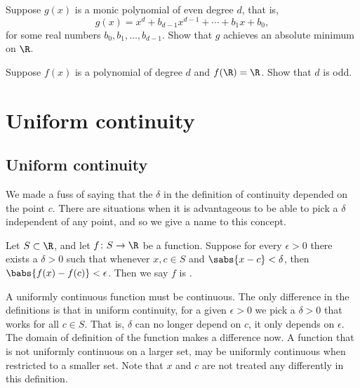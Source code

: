\begin{exercise}
Suppose $g(x)$ is a monic polynomial of even degree $d$, that is,
\begin{equation*}
g(x) = x^d + b_{d-1} x^{d-1} + \cdots + b_1 x + b_0 ,
\end{equation*}
for some real numbers $b_{0}, b_1, \ldots, b_{d-1}$.
Show that $g$ achieves an absolute minimum on $\R$.
\end{exercise}

\begin{exercise}
Suppose $f(x)$ is a polynomial of degree $d$ and 
$f(\R) = \R$.  Show that $d$ is odd.
\end{exercise}


\sectionnewpage
\section{Uniform continuity}
\label{sec:unifcont}



\subsection{Uniform continuity}

We made a fuss of saying that the $\delta$ in the definition of
continuity depended on the point $c$.  There are situations when it is
advantageous to be able to pick a $\delta$ independent of any point, and so we
give a name to this concept.

\begin{defn}
Let $S \subset \R$, and let $f \colon S \to \R$ be a function.
Suppose for every $\epsilon > 0$ there exists a $\delta > 0$
such that whenever $x, c \in S$ and
$\sabs{x-c} < \delta$, then $\babs{f(x)-f(c)} < \epsilon$.
Then we say $f$ is \emph{}.
\end{defn}

A uniformly continuous function must be continuous.
The only difference in the definitions
is that in uniform continuity,
for a given $\epsilon > 0$ we pick a $\delta > 0$ that
works for all $c \in S$.  That is, $\delta$ can no longer depend on $c$,
it only depends on $\epsilon$.  The domain of definition
of the function makes a difference now.  A function that is not uniformly
continuous on a larger set, may be uniformly continuous when restricted to a
smaller set.
Note that $x$ and $c$ are not treated any differently
in this definition.

